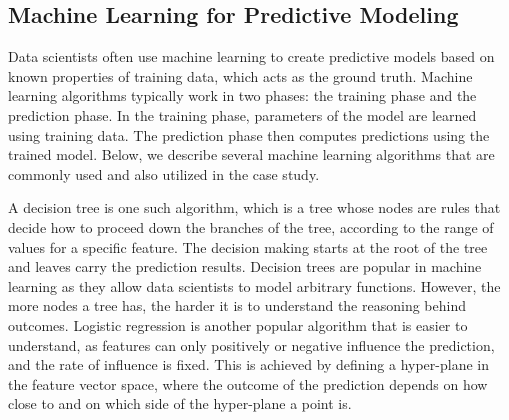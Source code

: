 \subsection{Machine Learning for Predictive Modeling}

Data scientists often use machine learning to create predictive models based on known properties of  training data, which acts as the ground truth. 
Machine learning algorithms typically work in two phases: the training phase and the prediction phase.
In the training phase, parameters of the model are
learned using training data.
The prediction phase then computes predictions using the trained model. %
Below, we describe several machine learning algorithms that are commonly used and also utilized in the case study.

A decision tree is one such algorithm, which is a tree whose nodes are rules that decide how to proceed down the branches of the tree, according to the range of values for a specific feature.  The decision making starts at the root of the tree and leaves carry the prediction results. Decision trees are popular in machine learning as they allow data scientists to model arbitrary functions.
However, the more nodes a tree has, the harder it is to understand the reasoning behind outcomes.
Logistic regression is another popular algorithm that is easier to understand, as features can only positively or negative influence the prediction, and the rate of influence is fixed.  This is achieved by defining a hyper-plane in the feature vector space, where the outcome of the prediction depends on how close to and on which side of the hyper-plane a point is.


